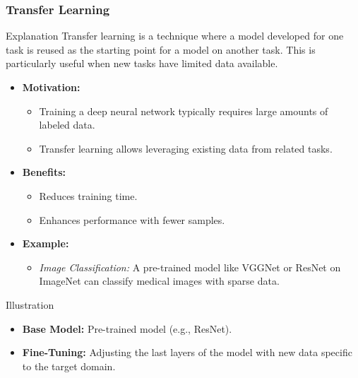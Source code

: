 \documentclass[aspectratio=169]{beamer}
\begin{document}
\begin{frame}[fragile]
    \frametitle{Transfer Learning}
    \begin{block}{Explanation}
        Transfer learning is a technique where a model developed for one task is reused as the starting point for a model on another task. This is particularly useful when new tasks have limited data available.
    \end{block}
    
    \begin{itemize}
        \item \textbf{Motivation:}
        \begin{itemize}
            \item Training a deep neural network typically requires large amounts of labeled data.
            \item Transfer learning allows leveraging existing data from related tasks.
        \end{itemize}

        \item \textbf{Benefits:}
        \begin{itemize}
            \item Reduces training time.
            \item Enhances performance with fewer samples.
        \end{itemize}

        \item \textbf{Example:}
        \begin{itemize}
            \item \textit{Image Classification:} A pre-trained model like VGGNet or ResNet on ImageNet can classify medical images with sparse data.
        \end{itemize}
    \end{itemize}

    \begin{block}{Illustration}
        \begin{itemize}
            \item \textbf{Base Model:} Pre-trained model (e.g., ResNet).
            \item \textbf{Fine-Tuning:} Adjusting the last layers of the model with new data specific to the target domain.
        \end{itemize}
    \end{block}
\end{frame}
\end{document}
